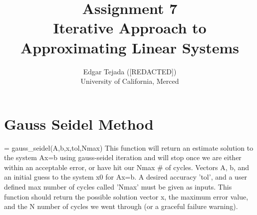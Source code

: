 \documentclass [12pt]{article}
\title{Assignment 7 \\\medskip Iterative Approach to Approximating Linear Systems}
\author{Edgar Tejada ([REDACTED])\\University of California, Merced}
\begin{document}
\maketitle

\newpage
\section{Gauss Seidel Method}
\indent [x, err, N] = gauss_seidel(A,b,x,tol,Nmax)
\indent \indent This function will return an estimate solution to the system Ax=b using gauss-seidel iteration and will stop once we are either within an acceptable error, or have hit our Nmax # of cycles. Vectors A, b, and an initial guess to the system x0 for Ax=b. A desired accuracy 'tol', and a user defined max number of cycles called 'Nmax' must be given as inputs. This function should return the possible solution vector x, the maximum error value, and the N number of cycles we went through (or a graceful failure warning).



\nocite{*} 
\printbibliography
\end{document}

